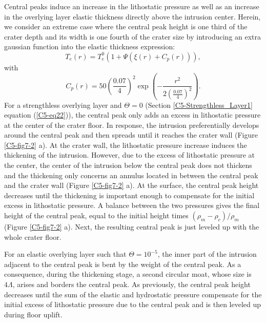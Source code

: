 Central peaks induce  an increase in the lithostatic  pressure as well
as an increase in the overlying layer elastic thickness directly above
the intrusion  center. Herein, we  consider an extreme case  where the
central peak height is one third of  the crater depth and its width is
one  fourth  of the  crater  size  by  introducing an  extra  gaussian
function into the elastic thickness expression:
\begin{equation}
  T_e(r)=T_e^0(1+\Psi(\xi(r)+C_p(r))),
\end{equation}
with
\begin{equation}
  C_p(r)=50 \left(\frac{0.07}{4}\right)^2\exp\left(-\frac{r^2}{2(\frac{0.07}{4})^2}\right).
\end{equation}
For   a  strengthless   overlying   layer   and  $\Theta=0$   (Section
\ref{C5-Strengthless_Layer1}  equation  (\ref{C5-eq22})), the  central
peak only adds an excess in  lithostatic pressure at the center of the
crater  floor.  In  response, the  intrusion  preferentially  develops
around the central  peak and then spreads until it  reaches the crater
wall (Figure \ref{C5-fig7-2}  a). At the crater  wall, the lithostatic
pressure increase  induces the  thickening of the  intrusion. However,
due to the excess of lithostatic pressure at the center, the center of
the  intrusion  below the  central  peak  does  not thickens  and  the
thickening only  concerns an  annulus located  in between  the central
peak and the  crater wall (Figure \ref{C5-fig7-2} a).  At the surface,
the central  peak height decreases  until the thickening  is important
enough to compensate for the initial excess in lithostatic pressure. A
balance  between the  two  pressures  gives the  final  height of  the
central    peak,     equal    to    the    initial     height    times
$(\rho_m-\rho_c)/\rho_m$   (Figure  \ref{C5-fig7-2}   a).  Next,   the
resulting central peak is just leveled up with the whole crater floor.

For an elastic  overlying layer such that  $\Theta=10^{-5}$, the inner
part of  the intrusion  adjacent to  the central peak  is bent  by the
weight of  the central peak.  As a consequence, during  the thickening
stage, a  second circular moat,  whose size is $4\Lambda$,  arises and
borders  the central  peak.  As previously,  the  central peak  height
decreases  until  the sum  of  the  elastic and  hydrostatic  pressure
compensate for the  initial excess of lithostatic pressure  due to the
central peak and is then leveled up during floor uplift.

